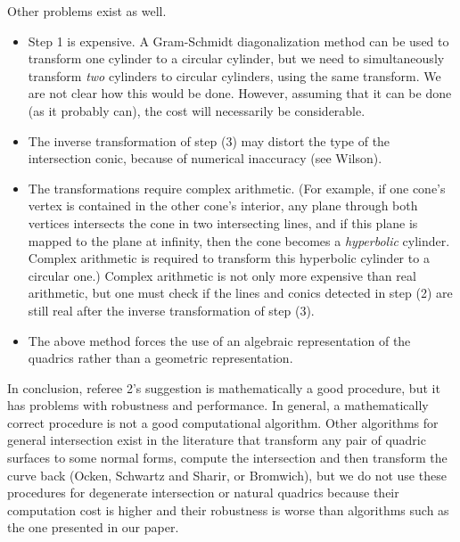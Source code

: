 \begin{letter}
Other problems exist as well.

\begin{itemize}
\item
	Step 1 is expensive.  
	A Gram-Schmidt diagonalization method can be used to transform
	one cylinder to a circular cylinder, but we need to simultaneously
	transform {\em two} cylinders to circular cylinders, using the 
	same transform.  We are not clear how this would be done.
	However, assuming that it can be done (as it probably can),
	the cost will necessarily be considerable.
\item
	The inverse transformation of step (3) 
	may distort the type of the intersection
	conic, because of numerical inaccuracy (see Wilson).
\item
The transformations require complex arithmetic.
(For example, if one cone's vertex is contained in the other cone's
 	interior, any plane through both vertices intersects the cone
 	in two intersecting lines, and if this plane is mapped to the plane
 	at infinity, then the cone becomes a {\em hyperbolic} cylinder.
 	Complex arithmetic is required to transform this hyperbolic cylinder
 	to a circular one.)
 Complex arithmetic is not only more expensive than real arithmetic,
 but one must check if the lines and conics detected in step (2) 
 are still real after the inverse transformation of step (3).
\item
 The above method forces the use of an algebraic
 representation of the quadrics rather than a geometric representation.
\end{itemize}

In conclusion, referee 2's suggestion is mathematically a good
procedure, but it has problems with robustness and performance.
In general, a mathematically correct procedure is not a good 
computational algorithm.
Other algorithms for general intersection exist in the literature
that transform any pair of
quadric surfaces to some normal forms, compute the intersection and
then transform the curve back (Ocken, Schwartz and Sharir, or Bromwich), 
but we do not use these procedures
for degenerate intersection or natural quadrics because their computation
cost is higher and their robustness is worse than algorithms
such as the one presented in our paper.


\end{letter}
